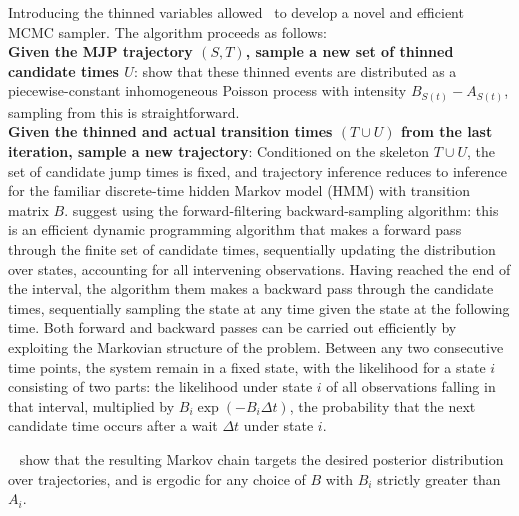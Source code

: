 Introducing the thinned variables allowed~\cite{RaoTeh13} to develop
a novel and efficient MCMC sampler. The algorithm proceeds as follows:\\
\textbf{Given the MJP trajectory $(S,T)$, sample a new set of thinned 
candidate times $U$}: \cite{RaoTeh12} show that these thinned events
are distributed as a piecewise-constant inhomogeneous Poisson process
with intensity $B_{S(t)}-A_{S(t)}$, sampling from this is
straightforward.\\
\textbf{Given the thinned and actual transition times $(T \cup U)$
    from the last iteration, sample a new trajectory}:
    Conditioned on the skeleton $T \cup U$, the set of candidate jump
    times is fixed, and trajectory inference reduces to inference for
    the familiar discrete-time hidden Markov model (HMM) with transition
    matrix $B$. \cite{RaoTeh13} suggest using the forward-filtering
    backward-sampling algorithm: this is an efficient dynamic 
    programming algorithm that makes a forward pass through the
    finite set of candidate times, sequentially updating the 
    distribution over states, accounting for all intervening observations.
    Having reached the end of the interval, the algorithm them
    makes a backward pass through the candidate times, sequentially
    sampling the state at any time given the state at the following
    time. Both forward and backward passes can be carried out
    efficiently by exploiting the Markovian structure of the problem.
    Between any two consecutive time points, the system
    remain in a fixed state, with the likelihood for a state $i$ consisting
    of two parts: the likelihood under state $i$ of all observations 
    falling in that interval, multiplied by $B_i\exp(-B_i\Delta t)$,
    the probability that the next candidate time occurs after a wait
    $\Delta t$ under state $i$.

    ~\cite{RaoTeh12} show that the resulting Markov chain targets
    the desired posterior distribution over trajectories, and is 
    ergodic for any choice of $B$ with $B_i$ strictly greater than
    $A_i$.

